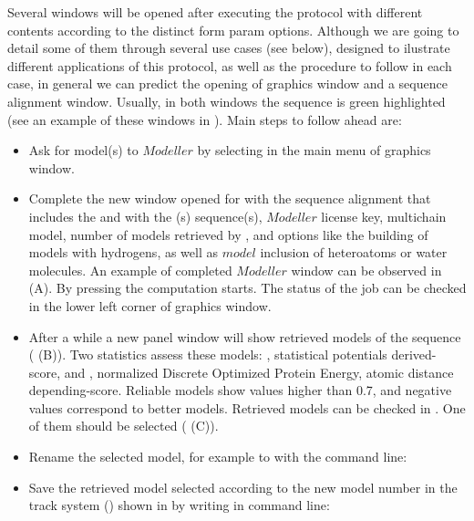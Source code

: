 \begin{itemize}
  Several \chimera windows will be opened after executing the protocol with different contents according to the distinct form param options. Although we are going to detail some of them through several use cases (see below), designed to ilustrate different applications of this protocol, as well as the procedure to follow in each case, in general we can predict the opening of \chimera graphics window and a sequence alignment window. Usually, in both windows the  sequence is green highlighted (see an example of these windows in ). Main steps to follow ahead are:
            \begin{itemize}
            \item Ask for model(s) to $Modeller$ by selecting  in the main menu of \chimera graphics window. 
            \item Complete the new window opened for  with the sequence alignment that includes the  and with the (s) sequence(s), $Modeller$ license key, multichain model, number of models retrieved by \modeller, and  options like the building of models with hydrogens, as well as $model$ inclusion of heteroatoms or water molecules. An example of completed $Modeller$ window can be observed in  (A). By pressing  the computation starts. The status of the job can be checked in the lower left corner of \chimera graphics window.
            \item After a while a new panel window will show retrieved models of the  sequence ( (B)). Two statistics assess these models: , statistical potentials derived-score, and , normalized Discrete Optimized Protein Energy, atomic distance depending-score. Reliable models show  values higher than 0.7, and negative  values correspond to better models.  Retrieved models can be checked in \chimera {}. One of them should be selected ( (C)).
            \item Rename the selected model, for example  to  with the command line:\\ 
            \item Save the retrieved model selected according to the new model number in the \scipion track system () shown in \chimera {} by writing in \chimera command line:\\
            \end{itemize}
  

\end{itemize}
